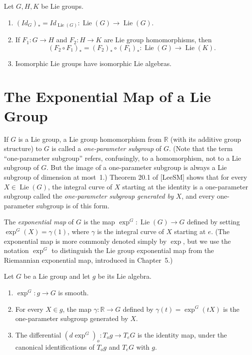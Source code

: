 \begin{proposition}
\label{prop:properties-of-induced-homomorphisms}

Let $G, H, K$ be Lie groups.

\begin{enumerate}
\item[$(a)$] $(Id_G)_* = Id_{\operatorname{Lie}(G)} : \operatorname{Lie}(G) \to \operatorname{Lie}(G)$.
\item[$(b)$] If $F_1 : G \to H$ and $F_2 : H \to K$ are Lie group homomorphisms, then
\[
(F_2 \circ F_1)_* = (F_2)_* \circ (F_1)_* : \operatorname{Lie}(G) \to \operatorname{Lie}(K).
\]
\item[$(c)$] Isomorphic Lie groups have isomorphic Lie algebras.
\end{enumerate}
\end{proposition}

\section{The Exponential Map of a Lie Group}

If $G$ is a Lie group, a Lie group homomorphism from $\mathbb{R}$ (with its additive group structure) to $G$ is called a \emph{one-parameter subgroup} of $G$. (Note that the term ``one-parameter subgroup'' refers, confusingly, to a homomorphism, not to a Lie subgroup of $G$. But the image of a one-parameter subgroup is always a Lie subgroup of dimension at most~1.) Theorem 20.1 of [LeeSM] shows that for every $X \in \operatorname{Lie}(G)$, the integral curve of $X$ starting at the identity is a one-parameter subgroup called the \emph{one-parameter subgroup generated by} $X$, and every one-parameter subgroup is of this form.

The \emph{exponential map} of $G$ is the map $\exp^G : \operatorname{Lie}(G) \to G$ defined by setting $\exp^G(X) = \gamma(1)$, where $\gamma$ is the integral curve of $X$ starting at $e$. (The exponential map is more commonly denoted simply by $\exp$, but we use the notation $\exp^G$ to distinguish the Lie group exponential map from the Riemannian exponential map, introduced in Chapter~5.)

\begin{proposition}
\label{prop:properties-of-lie-group-exponential-map}

Let $G$ be a Lie group and let $g$ be its Lie algebra.

\begin{enumerate}
\item[$(a)$] $\exp^G : g \to G$ is smooth.
\item[$(b)$] For every $X \in g$, the map $\gamma : \mathbb{R} \to G$ defined by $\gamma(t) = \exp^G(tX)$ is the one-parameter subgroup generated by $X$.
\item[$(c)$] The differential $(d\exp^G)_o : T_o g \to T_e G$ is the identity map, under the canonical identifications of $T_o g$ and $T_e G$ with $g$.
\end{enumerate}
\end{proposition}

